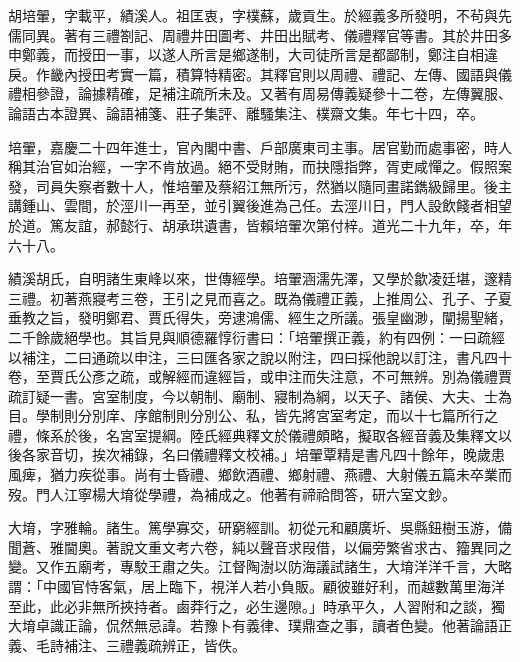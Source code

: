 \begin{pinyinscope}
胡培翬，字載平，績溪人。祖匡衷，字樸蘇，歲貢生。於經義多所發明，不茍與先儒同異。著有三禮劄記、周禮井田圖考、井田出賦考、儀禮釋官等書。其於井田多申鄭義，而授田一事，以遂人所言是鄉遂制，大司徒所言是都鄙制，鄭注自相違戾。作畿內授田考實一篇，積算特精密。其釋官則以周禮、禮記、左傳、國語與儀禮相參證，論據精確，足補注疏所未及。又著有周易傳義疑參十二卷，左傳翼服、論語古本證異、論語補箋、莊子集評、離騷集注、樸齋文集。年七十四，卒。

培翬，嘉慶二十四年進士，官內閣中書、戶部廣東司主事。居官勤而處事密，時人稱其治官如治經，一字不肯放過。絕不受財賄，而抉隱指弊，胥吏咸憚之。假照案發，司員失察者數十人，惟培翬及蔡紹江無所污，然猶以隨同畫諾鐫級歸里。後主講鍾山、雲間，於涇川一再至，並引翼後進為己任。去涇川日，門人設飲餞者相望於道。篤友誼，郝懿行、胡承珙遺書，皆賴培翬次第付梓。道光二十九年，卒，年六十八。

績溪胡氏，自明諸生東峰以來，世傳經學。培翬涵濡先澤，又學於歙凌廷堪，邃精三禮。初著燕寢考三卷，王引之見而喜之。既為儀禮正義，上推周公、孔子、子夏垂教之旨，發明鄭君、賈氏得失，旁逮鴻儒、經生之所議。張皇幽渺，闡揚聖緒，二千餘歲絕學也。其旨見與順德羅惇衍書曰：「培翬撰正義，約有四例：一曰疏經以補注，二曰通疏以申注，三曰匯各家之說以附注，四曰採他說以訂注，書凡四十卷，至賈氏公彥之疏，或解經而違經旨，或申注而失注意，不可無辨。別為儀禮賈疏訂疑一書。宮室制度，今以朝制、廟制、寢制為綱，以天子、諸侯、大夫、士為目。學制則分別庠、序館制則分別公、私，皆先將宮室考定，而以十七篇所行之禮，條系於後，名宮室提綱。陸氏經典釋文於儀禮頗略，擬取各經音義及集釋文以後各家音切，挨次補錄，名曰儀禮釋文校補。」培翬覃精是書凡四十餘年，晚歲患風痺，猶力疾從事。尚有士昏禮、鄉飲酒禮、鄉射禮、燕禮、大射儀五篇未卒業而歿。門人江寧楊大堉從學禮，為補成之。他著有禘祫問答，研六室文鈔。

大堉，字雅輪。諸生。篤學寡交，研窮經訓。初從元和顧廣圻、吳縣鈕樹玉游，備聞蒼、雅閫奧。著說文重文考六卷，純以聲音求叚借，以偏旁繁省求古、籀異同之變。又作五廟考，專駮王肅之失。江督陶澍以防海議試諸生，大堉洋洋千言，大略謂：「中國官恃客氣，居上臨下，視洋人若小負販。顧彼雖好利，而越數萬里海洋至此，此必非無所挾持者。鹵莽行之，必生邊隙。」時承平久，人習附和之談，獨大堉卓識正論，侃然無忌諱。若豫卜有義律、璞鼎查之事，讀者色變。他著論語正義、毛詩補注、三禮義疏辨正，皆佚。


\end{pinyinscope}
